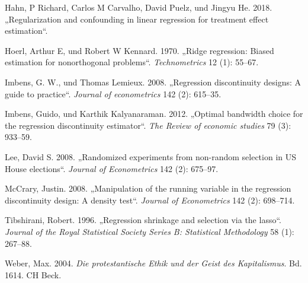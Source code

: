 \documentclass[
  a4paper,
  DIV=11,
  oneside]{scrreprt}
\newlength{\cslhangindent}
\newlength{\cslentryspacingunit} %
\newenvironment{CSLReferences}[2] %
 {%
  \setlength{\parindent}{0pt}
  \ifodd #1
  \let\oldpar\par
  \def\par{\hangindent=\cslhangindent\oldpar}
  \fi
  \setlength{\parskip}{#2\cslentryspacingunit}
 }%
 {}
\begin{document}
\begin{CSLReferences}{1}{0}
\leavevmode{}%
Hahn, P Richard, Carlos M Carvalho, David Puelz, und Jingyu He. 2018.
{„Regularization and confounding in linear regression for treatment
effect estimation``}.

\leavevmode{}%
Hoerl, Arthur E, und Robert W Kennard. 1970. {„{Ridge regression: Biased
estimation for nonorthogonal problems}``}. \emph{Technometrics} 12 (1):
55--67.

\leavevmode{}%
Imbens, G. W., und Thomas Lemieux. 2008. {„Regression discontinuity
designs: A guide to practice``}. \emph{Journal of econometrics} 142 (2):
615--35.

\leavevmode{}%
Imbens, Guido, und Karthik Kalyanaraman. 2012. {„Optimal bandwidth
choice for the regression discontinuity estimator``}. \emph{The Review
of economic studies} 79 (3): 933--59.

\leavevmode{}%
Lee, David S. 2008. {„Randomized experiments from non-random selection
in US House elections``}. \emph{Journal of Econometrics} 142 (2):
675--97.

\leavevmode{}%
McCrary, Justin. 2008. {„Manipulation of the running variable in the
regression discontinuity design: A density test``}. \emph{Journal of
Econometrics} 142 (2): 698--714.

\leavevmode{}%
Tibshirani, Robert. 1996. {„Regression shrinkage and selection via the
lasso``}. \emph{Journal of the Royal Statistical Society Series B:
Statistical Methodology} 58 (1): 267--88.

\leavevmode{}%
Weber, Max. 2004. \emph{Die protestantische Ethik und der Geist des
Kapitalismus}. Bd. 1614. CH Beck.

\end{CSLReferences}
\end{document}
